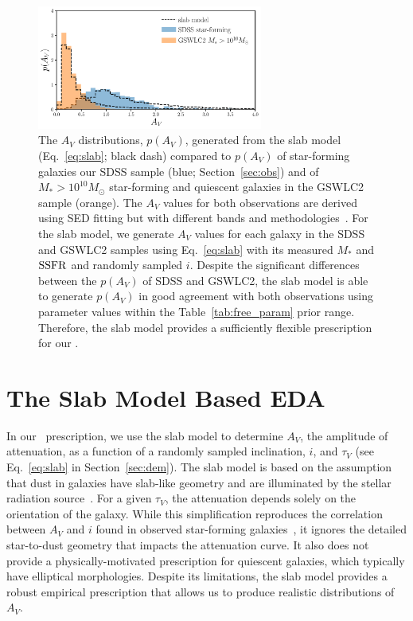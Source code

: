 \begin{figure}
    \begin{center}
        \includegraphics[width=0.66\textwidth]{figs/slab_model.pdf} 
        \caption{\label{fig:av_dist}
        The $A_V$ distributions, $p(A_V)$, generated from the slab model (Eq.~\ref{eq:slab};
        black dash) compared to $p(A_V)$ of star-forming galaxies our SDSS
        sample (blue; Section~\ref{sec:obs}) and of $M_* > 10^{10}M_\odot$
        star-forming and quiescent galaxies in the GSWLC2 sample (orange). 
        The $A_V$ values for both observations are derived using SED
        fitting but with different bands and methodologies~\citep{brinchmann2004, salim2018}. 
        For the slab model, we generate $A_V$ values for each galaxy
        in the SDSS and GSWLC2 samples using Eq.~\ref{eq:slab} with its
        measured $M_*$ and ${\rm SSFR}$ and randomly sampled $i$. 
        Despite the significant differences between the $p(A_V)$ of SDSS and
        GSWLC2, the slab model is able to generate $p(A_V)$ in good agreement
        with both observations using parameter values within the
        Table~\ref{tab:free_param} prior range. 
        Therefore, the slab model provides a sufficiently flexible prescription
        for our \eda.
        }
    \end{center}
\end{figure}


\section{The Slab Model Based EDA}  \label{sec:slab} 
In our \eda~prescription, we use the slab model to determine $A_V$, the
amplitude of attenuation, as a function of a randomly sampled inclination,
$i$, and $\tau_V$ (see Eq.~\ref{eq:slab} in Section~\ref{sec:dem}).
The slab model is based on the assumption that dust in galaxies have
slab-like geometry and are illuminated by the stellar radiation
source~\citep{somerville1999}. 
For a given $\tau_V$, the attenuation depends solely on the orientation of the galaxy. 
While this simplification reproduces the correlation between $A_V$ and $i$
found in observed star-forming galaxies~\citep[\eg][]{conroy2010, wild2011,
battisti2017, salim2020}, it ignores the detailed star-to-dust geometry that
impacts the attenuation curve. 
It also does not provide a physically-motivated prescription for quiescent
galaxies, which typically have elliptical morphologies.
Despite its limitations, the slab model provides a robust empirical
prescription that allows us to produce realistic distributions of $A_V$. 

